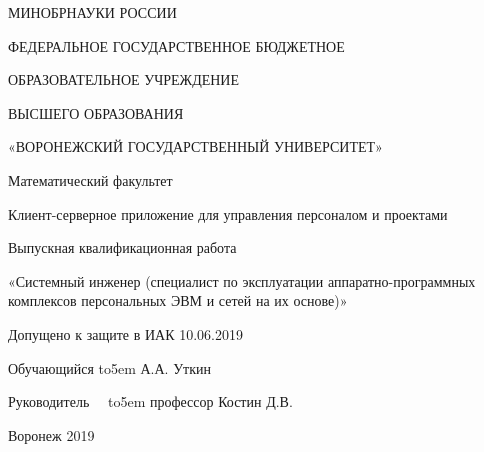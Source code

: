 \documentclass[14pt, a4paper]{extarticle}
\begin{document}
    \begin{titlepage}
        \begin{center}
            МИНОБРНАУКИ РОССИИ

            ФЕДЕРАЛЬНОЕ ГОСУДАРСТВЕННОЕ БЮДЖЕТНОЕ

            ОБРАЗОВАТЕЛЬНОЕ УЧРЕЖДЕНИЕ

            ВЫСШЕГО ОБРАЗОВАНИЯ

            «ВОРОНЕЖСКИЙ ГОСУДАРСТВЕННЫЙ УНИВЕРСИТЕТ»

            \begin{spacing}{4}
            \end{spacing}

            Математический факультет
            \begin{spacing}{5.5}
            \end{spacing}


            Клиент-серверное приложение для управления персоналом и проектами
            \begin{spacing}{4.5}
            \end{spacing}


            Выпускная квалификационная работа 

            «Системный инженер (специалист по эксплуатации аппаратно-программных комплексов персональных ЭВМ и сетей на их основе)»

        \end{center}

        \begin{spacing}{5.5}
        \end{spacing}

        Допущено к защите в ИАК	 10.06.2019

        \begin{spacing}{2}
        \end{spacing}

        \begin{spacing}{2}
        \end{spacing}
        Обучающийся \def\hrf#1{\hbox to#1{\hrulefill}}
        \hrf{5em} А.А. Уткин
        \begin{spacing}{2}
        \end{spacing}
        Руководитель\ \ \def\hrf#1{\hbox to#1{\hrulefill}}
        \hrf{5em}
                профессор Костин Д.В.

        \begin{center}
            \begin{spacing}{4}
            \end{spacing}
            Воронеж 2019
        \end{center}
    \end{titlepage}
\end{document}
